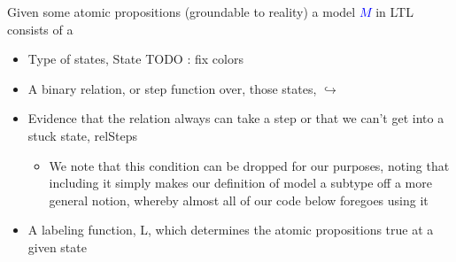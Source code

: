 \documentclass[a4paper, 11pt]{article}
\newcommand{\blue}[1]{\textcolor{blue}{#1}}
\newcommand{\pink}[1]{\textcolor{hotmagenta}{#1}}
\begin{document}
Given some atomic propositions (groundable to reality) a model \blue{$M$} in LTL consists
of a

\begin{itemize}
\item Type of states, \pink{State} TODO : fix colors
\item A binary relation, or step function over, those states, \pink{$\hookrightarrow$}
\item Evidence that the relation always can take a step or that we can't get into a stuck state, \pink{relSteps}
\begin{itemize}
\item We note that this condition can be dropped for our purposes, noting that including it simply makes our definition of model a subtype off a more general notion, whereby almost all of our code below foregoes using it
\end{itemize}
\item A labeling function, L, which determines the atomic propositions true at a given state
\end{itemize}

\begin{code}%
\>[0]\AgdaSpace{}%
\AgdaSpace{}%
\AgdaSymbol{(}\AgdaSpace{}%
\AgdaSymbol{:}\AgdaSpace{}%
\AgdaSymbol{)}\AgdaSpace{}%
\AgdaSymbol{:}\AgdaSpace{}%
\AgdaSpace{}%
\<%
\\
\>[0][@{}l@{\AgdaIndent{0}}]%
\>[2]\<%
\\
\>[2][@{}l@{\AgdaIndent{0}}]%
\>[4]\AgdaSpace{}%
\AgdaSymbol{:}\AgdaSpace{}%
\<%
\\
%
\>[4]\AgdaSpace{}%
\AgdaSymbol{:}\AgdaSpace{}%
\AgdaSpace{}%
\<%
\\
%
\>[4]\AgdaSpace{}%
\AgdaSymbol{:}\AgdaSpace{}%
\AgdaSpace{}%
\<%
\\
%
\>[4]\<%
\\
%
\>[4]\AgdaSpace{}%
\AgdaSymbol{:}\AgdaSpace{}%
\AgdaSpace{}%
\AgdaSpace{}%
\AgdaSpace{}%
\AgdaSpace{}%
\<%
\end{code}
\end{document}
